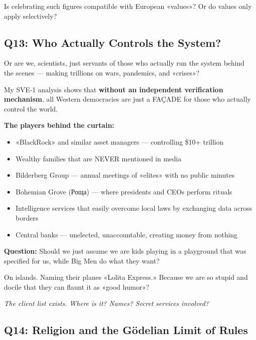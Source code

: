 \documentclass[11pt,a4paper]{article}
\theoremstyle{definition}
\theoremstyle{remark}
\begin{document}
Is celebrating such figures compatible with European «values»? Or do values only apply selectively?

\subsection{Q13: Who Actually Controls the System?}

Or are we, scientists, just servants of those who actually run the system behind the scenes — making trillions on wars, pandemics, and «crises»?

My SVE-1 analysis shows that \textbf{without an independent verification mechanism}, all Western democracies are just a FAÇADE for those who actually control the world.

\textbf{The players behind the curtain:}
\begin{itemize}
\item «BlackRock» and similar asset managers — controlling \$10+ trillion
\item Wealthy families that are NEVER mentioned in media
\item Bilderberg Group — annual meetings of «elites» with no public minutes
\item Bohemian Grove (Роща) — where presidents and CEOs perform rituals
\item Intelligence services that easily overcome local laws by exchanging data across borders
\item Central banks — unelected, unaccountable, creating money from nothing
\end{itemize}

\textbf{Question:} Should we just assume we are kids playing in a playground that was specified for us, while Big Men do what they want?

On islands. Naming their planes «Lolita Express.» Because we are so stupid and docile that they can flaunt it as «good humor»?

\textit{The client list exists. Where is it? Names? Secret services involved?}

\subsection{Q14: Religion and the Gödelian Limit of Rules}
\end{document}
